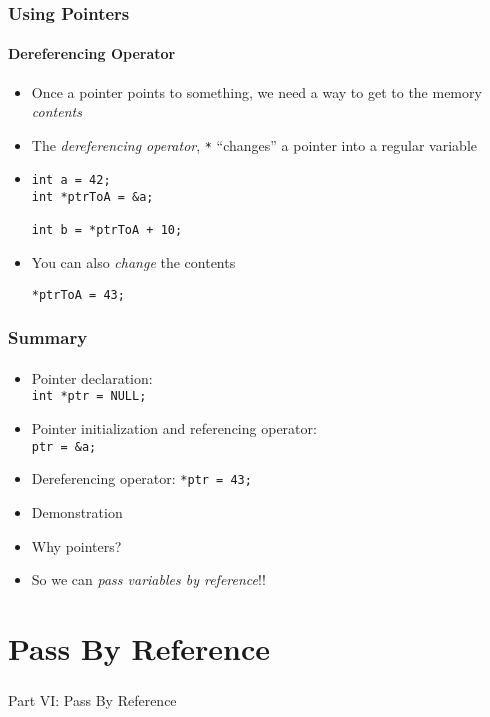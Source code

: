\documentclass[]{beamer}
\begin{document}
\begin{frame}[fragile]
  \frametitle{Using Pointers}
  \framesubtitle{Dereferencing Operator}

\begin{itemize}[<+->]
  \item Once a pointer points to something, we need a way to get to the memory \emph{contents}  
  \item The \emph{dereferencing operator}, \texttt{*} ``changes'' a pointer into
  a regular variable
  \item[~]
\begin{verbatim}
int a = 42;
int *ptrToA = &a;

int b = *ptrToA + 10;
\end{verbatim}
  \item You can also \emph{change} the contents
\begin{verbatim}
*ptrToA = 43;
\end{verbatim}
\end{itemize}
    
\end{frame}


\begin{frame}[fragile]
  \frametitle{Summary}
  \framesubtitle{}

\begin{itemize}[<+->]
  \item Pointer declaration:\\
  \texttt{int *ptr = NULL;}
  \item Pointer initialization and referencing operator:\\
  \texttt{ptr = &a;}
  \item Dereferencing operator:
  \texttt{*ptr = 43;}
  \item Demonstration
  \item Why pointers?  
  \item So we can \emph{pass variables by reference}!!
\end{itemize}

\end{frame}



\section{Pass By Reference}

\begin{frame}
    \frametitle{}
    \framesubtitle{}
    
    \begin{center}
    {\Huge Part VI: Pass By Reference}\\
    {\Large ~}
    \end{center}

\end{frame}
\end{document}
